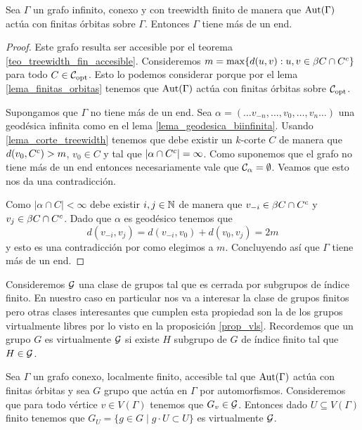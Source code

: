 \documentclass[tesis.tex]{subfiles}
\begin{document}
\begin{lema}\label{lema_tw_mas_1_end}
	Sea $\Gamma$ un grafo infinito, conexo y con treewidth finito de manera que $\text{Aut}(\Gamma)$ actúa con finitas órbitas sobre $\Gamma$.
	Entonces $\Gamma$ tiene más de un end.
\end{lema}
\begin{proof}
	Este grafo resulta ser accesible por el teorema \ref{teo_treewidth_fin_accesible}.
	Consideremos $m = \max \{  d(u,v) : u,v \in \beta C \cap C^{c} \}$ para todo $C \in {\cal C}_{\text{opt}}$.
	Esto lo podemos considerar porque por el lema \ref{lema_finitas_orbitas} tenemos que $\text{Aut}(\Gamma)$ actúa con finitas órbitas sobre ${\cal C}_{\text{opt}}$.
	
	Supongamos que $\Gamma$ no tiene más de un end.
	Sea $\alpha = (\dots v_{-n}, \dots, v_{0}, \dots, v_{n} \dots)$ una geodésica infinita como en el lema \ref{lema_geodesica_biinfinita}.
	Usando \ref{lema_corte_treewidth} tenemos que debe existir un $k$-corte $C$ de manera que $d(v_{0}, C^{c}) > m$, $v_{0} \in C$ y tal que $|\alpha \cap C^{c}|=\infty$.
	Como suponemos que el grafo no tiene más de un end entonces necesariamente vale que ${\cal{C}}_{\alpha} = \emptyset$. 
	Veamos que esto nos da una contradicción.
	
	Como $|\alpha \cap C| < \infty$ debe existir $i,j \in \mathbb{N}$ de manera que $v_{-i} \in \beta C \cap C^{c}$ y $v_{j} \in \beta C \cap C^{c}$.
	Dado que $\alpha$ es geodésico tenemos que
	\[
		d(v_{-i},v_{j}) = d(v_{-i},v_{0}) + d(v_{0}, v_{j}) = 2m
	\]
	y esto es una contradicción por como elegimos a $m$. 
	Concluyendo así que $\Gamma$ tiene más de un end.
	
\end{proof}

Consideremos ${\cal G}$ una clase de grupos tal que es cerrada por subgrupos de índice finito.
En nuestro caso en particular nos va a interesar la clase de grupos finitos pero otras clases interesantes que cumplen esta propiedad son la de los grupos virtualmente libres por lo visto en la proposición \ref{prop_vls}.
Recordemos que un grupo $G$ es virtualmente ${\cal G}$ si existe $H$ subgrupo de $G$ de índice finito tal que $H \in {\cal G}$.

\begin{lema}\label{lema_accion_virtualmente_g}
	Sea $\Gamma$ un grafo conexo, localmente finito, accesible tal que $\text{Aut}(\Gamma)$ actúa con finitas órbitas y sea $G$ grupo que actúa en $\Gamma$ por automorfismos.
	Consideremos que para todo vértice $v \in V(\Gamma)$ tenemos que $G_{v} \in {\cal G}$.
	Entonces dado $U \subseteq V(\Gamma)$ finito tenemos que $G_{U} = \{ g \in G \mid g \cdot { U} \subset { U} \}$ es virtualmente ${\cal G}$.
\end{lema}
\end{document}
